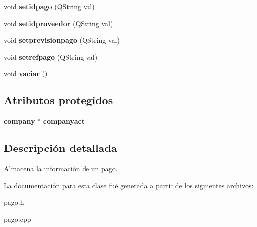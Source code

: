 \begin{CompactItemize}
\item 
void {\bf setidpago} (QString val)\label{classPago_a15}

\item 
void {\bf setidproveedor} (QString val)\label{classPago_a16}

\item 
void {\bf setprevisionpago} (QString val)\label{classPago_a17}

\item 
void {\bf setrefpago} (QString val)\label{classPago_a18}

\item 
void {\bf vaciar} ()\label{classPago_a19}

\end{CompactItemize}
\subsection*{Atributos protegidos}
\begin{CompactItemize}
\item 
{\bf company} $\ast$ {\bf companyact}\label{classPago_p0}

\end{CompactItemize}


\subsection{Descripci\'{o}n detallada}
Almacena la informaci\'{o}n de un pago. 



La documentaci\'{o}n para esta clase fu\'{e} generada a partir de los siguientes archivos:\begin{CompactItemize}
\item 
pago.h\item 
pago.cpp\end{CompactItemize}
